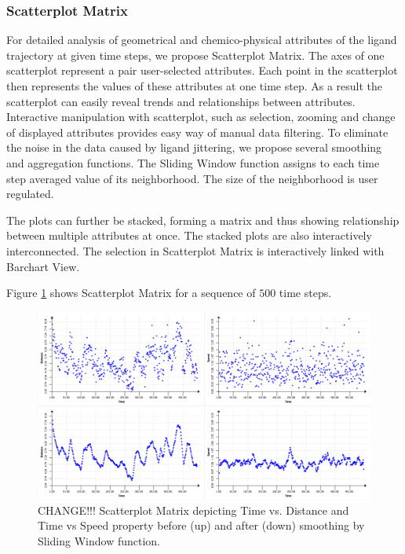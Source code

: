 \documentclass[twocolumn]{bmcart}%
\begin{document}
\subsubsection*{Scatterplot Matrix}
For detailed analysis of geometrical and chemico-physical attributes of the ligand trajectory at given time steps, we propose Scatterplot Matrix.
The axes of one scatterplot represent a pair user-selected attributes.
Each point in the scatterplot then represents the values of these attributes at one time step.
As a result the scatterplot can easily reveal trends and relationships between attributes.
Interactive manipulation with scatterplot, such as selection, zooming and change of displayed attributes provides easy way of manual data filtering. 
To eliminate the noise in the data caused by ligand jittering, we propose several smoothing and aggregation functions.
The Sliding Window function assigns to each time step averaged value of its neighborhood.
The size of the neighborhood is user regulated. 

The plots can further be stacked, forming a matrix and thus showing relationship between multiple attributes at once.
The stacked plots are also interactively interconnected.
The selection in Scatterplot Matrix is interactively linked with Barchart View.

Figure \ref{fig:scatterplot} shows Scatterplot Matrix for a sequence of $500$ time steps.

\begin{figure}[htb]
	\centering
  \includegraphics[width=0.95\linewidth]{img/scatterplot.png}
  \caption{\label{fig:scatterplot} CHANGE!!! Scatterplot Matrix depicting Time vs. Distance and Time vs Speed property before (up) and after (down) smoothing by Sliding Window function.}
\end{figure}
\end{document}
